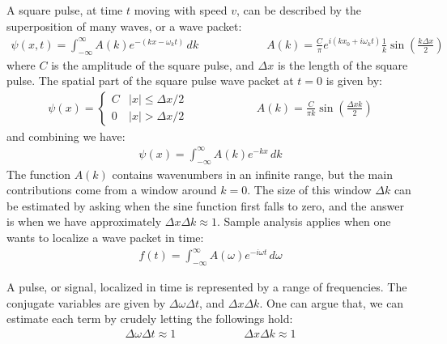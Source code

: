 \documentclass[11pt]{article}
\theoremstyle{break}
\theoremstyle{break}
\begin{document}
A square pulse, at time $t$ moving with speed $v$, can be described by the superposition of many waves, or a wave packet:
\begin{align*}
\psi(x,t) = \int_{-\infty}^\infty A(k) e^{-(kx - \omega_k t)}\, dk\qquad\qquad\qquad A(k) = \frac{C}{\pi}e^{i(kx_0 +i \omega_k t)}\frac{1}{k}\sin\left( \frac{k\Delta x}{2}\right)
\end{align*}
where $C$ is the amplitude of the square pulse, and $\Delta x$ is the length of the square pulse. The spatial part of the square pulse wave packet at $t=0$ is given by:
\begin{align*}
\psi(x) = \begin{cases}
 C & |x| \leq \Delta x/2\\
 0 & |x| > \Delta x/2
\end{cases}\qquad\qquad\qquad A(k) = \frac{C}{\pi k}\sin\left( \frac{\Delta xk}{2}\right)
\end{align*}
and combining we have:
\begin{align*}
\psi(x) = \int_{-\infty}^\infty A(k) e^{-kx}\, dk
\end{align*}
The function $A(k)$ contains wavenumbers in an infinite range, but the main contributions come from a window around $k=0$. The size of this window $\Delta k$ can be estimated by asking when the sine function first falls to zero, and the answer is when we have approximately $\Delta x \Delta k \approx 1$. Sample analysis applies when one wants to localize a wave packet in time:
\begin{align*}
f(t) = \int_{-\infty}^{\infty}A(\omega) e^{-i\omega t}\, d\omega
\end{align*}

A pulse, or signal, localized in time is represented by a range of frequencies. The conjugate variables are given by $\Delta \omega \Delta t$, and $\Delta x \Delta k$. One can argue that, we can estimate each term by crudely letting the followings hold:
\begin{align*}
\Delta \omega \Delta t \approx 1 \qquad\qquad\qquad \Delta x \Delta k \approx 1
\end{align*}
\end{document}
